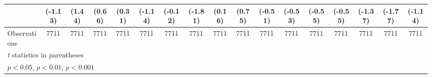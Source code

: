\begin{table}[htbp]
\begin{tabular}{l*{16}{c}}
                    &     (-1.13)         &      (1.44)         &      (0.66)         &      (0.31)         &     (-1.14)         &     (-0.12)         &     (-1.81)         &      (0.16)         &      (0.75)         &     (-0.51)         &     (-0.53)         &     (-0.55)         &     (-0.55)         &     (-1.37)         &     (-1.77)         &     (-1.14)         \\
\midrule
Observations        &        7711         &        7711         &        7711         &        7711         &        7711         &        7711         &        7711         &        7711         &        7711         &        7711         &        7711         &        7711         &        7711         &        7711         &        7711         &        7711         \\
\bottomrule
\multicolumn{17}{l}{\footnotesize \textit{t} statistics in parentheses}\\
\multicolumn{17}{l}{\footnotesize \sym{*} \(p<0.05\), \sym{**} \(p<0.01\), \sym{***} \(p<0.001\)}\\
\end{tabular}
\end{table}
